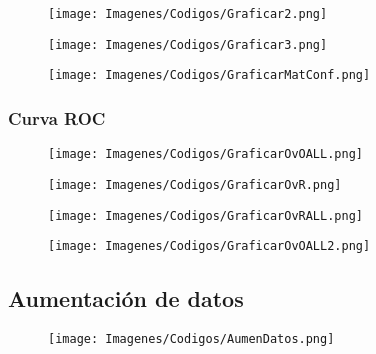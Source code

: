 \documentclass{report}
\begin{document}
\begin{figure}[H]
    \raggedright
    \texttt{[image: Imagenes/Codigos/Graficar2.png]}
\end{figure}


\begin{figure}[H]
    \raggedright
    \texttt{[image: Imagenes/Codigos/Graficar3.png]}
\end{figure}


\begin{figure}[H]
    \raggedright
    \texttt{[image: Imagenes/Codigos/GraficarMatConf.png]}
\end{figure}


\subsubsection{Curva ROC}

\begin{figure}[H]
    \raggedright
    \texttt{[image: Imagenes/Codigos/GraficarOvOALL.png]}
\end{figure}

\begin{figure}[H]
    \raggedright
    \texttt{[image: Imagenes/Codigos/GraficarOvR.png]}
\end{figure}


\begin{figure}[H]
    \raggedright
    \texttt{[image: Imagenes/Codigos/GraficarOvRALL.png]}
\end{figure}

\begin{figure}[H]
    \raggedright
    \texttt{[image: Imagenes/Codigos/GraficarOvOALL2.png]}
\end{figure}










\subsection{Aumentación de datos}

\begin{figure}[H]
    \raggedright
    \texttt{[image: Imagenes/Codigos/AumenDatos.png]}
\end{figure}
\end{document}
